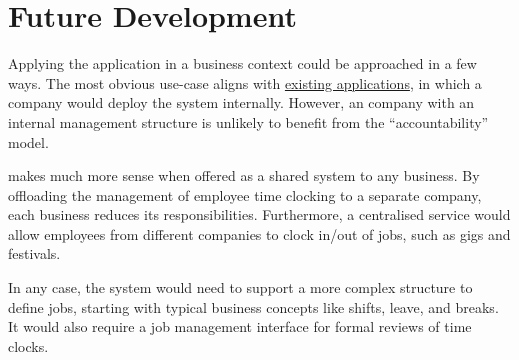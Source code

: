 \section{Future Development}

Applying the application in a business context could be
approached in a few ways.
The most obvious use-case aligns with
\hyperref[s:existing]{existing applications}, in which a
company would deploy the system internally.
However, an company with an internal management structure
is unlikely to benefit from the \enquote{accountability}
model.

\projectname{} makes much more sense when offered as a
shared system to any business.
By offloading the management of employee time clocking to a
separate company, each business reduces its
responsibilities.
Furthermore, a centralised service would allow employees
from different companies to clock in/out of jobs, such as
gigs and festivals.

In any case, the system would need to support a more
complex structure to define jobs, starting with typical
business concepts like shifts, leave, and breaks.
It would also require a job management interface for formal
reviews of time clocks.
